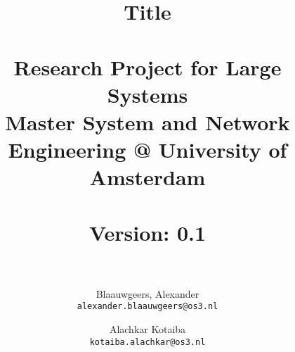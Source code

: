 \documentclass[a4paper, 12pt, one column]{article}
\title{ Title \\~\\
\large Research Project for Large Systems
\\Master System and Network Engineering @ University of Amsterdam\\~\\
\textbf{Version:} 0.1\\~\\}
\author{Blaauwgeers, Alexander \\ \texttt{alexander.blaauwgeers@os3.nl} \and Alachkar Kotaiba  \\ \texttt{kotaiba.alachkar@os3.nl}}
\begin{document}
\maketitle
\clearpage






\\~\\






\\~\\





\nocite{*}
\printbibliography
\end{document}
